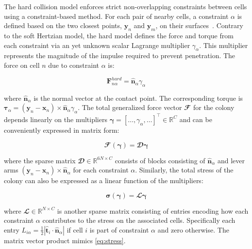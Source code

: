 \documentclass[conference]{IEEEtran}
\begin{document}
The hard collision model enforces strict non-overlapping constraints between cells using a constraint-based method. For each pair of nearby cells, a constraint $\alpha$ is defined based on the two closest points, $\mathbf{y}_n$ and $\mathbf{y}_m$, on their surfaces~\cite{Weady2024}. Contrary to the soft Hertzian model, the hard model defines the force and torque from each constraint via an yet unknown scalar Lagrange multiplier $\gamma_\alpha$. This multiplier represents the magnitude of the impulse required to prevent penetration. The force on cell $n$ due to constraint $\alpha$ is:

\begin{equation} \label{eq:constraint_force}
    \mathbf{F}^{hard}_{n\alpha} = \hat{\mathbf{n}}_\alpha \gamma_\alpha
\end{equation}

where $\hat{\mathbf{n}}_\alpha$ is the normal vector at the contact point. The corresponding torque is $\boldsymbol{\tau}_{\alpha} = (\mathbf{y}_n - \mathbf{x}_n) \times \hat{\mathbf{n}}_\alpha \gamma_\alpha$. The total generalized force vector $\mathbfcal{F}$ for the colony depends linearly on the multipliers $\boldsymbol{\gamma} = [\dots, \gamma_\alpha, \dots]^\top \in \mathbb{R}^{C}$ and can be conveniently expressed in matrix form:

\begin{equation}
    \mathbfcal{F}(\boldsymbol{\gamma}) = \mathbfcal{D} \boldsymbol{\gamma}
\end{equation}

where the sparse matrix $\mathbfcal{D} \in \mathbb{R}^{6N \times C}$ consists of blocks consisting of $\hat{\mathbf{n}}_\alpha$ and lever arms $(\mathbf{y}_n - \mathbf{x}_n) \times \hat{\mathbf{n}}_\alpha$ for each constraint $\alpha$. Similarly, the total stress of the colony can also be expressed as a linear function of the multipliers:

\begin{equation}
    \boldsymbol{\sigma}(\boldsymbol{\gamma}) = \mathbfcal{L} \boldsymbol{\gamma}
\end{equation}

where $\mathbfcal{L} \in \mathbb{R}^{N \times C}$ is another sparse matrix consisting of entries encoding how each constraint $\alpha$ contributes to the stress on the associated cells. Specifically each entry $L_{i\alpha} = \frac{1}{2} |\hat{\mathbf{t}}_i \cdot \hat{\mathbf{n}}_\alpha|$ if cell $i$ is part of constraint $\alpha$ and zero otherwise. The matrix vector product mimics \autoref{eq:stress}.
\end{document}
